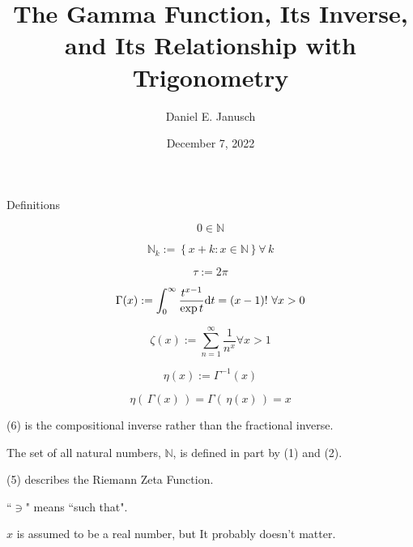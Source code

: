 \documentclass[12pt]{article}
\begin{document}
\title{The Gamma Function, Its Inverse, and Its Relationship with Trigonometry}
\author{Daniel E. Janusch}
\date{December 7, 2022} %
\maketitle

\begin{section}{Definitions}

	\begin{equation}
		0\in\mathbb N
	\end{equation}

	\begin{equation}
		\mathbb N_k:=\left\{x+k:x\in\mathbb N\right\}\forall\,k
	\end{equation}

	\begin{equation}
		\tau:=2\pi
	\end{equation}

	\begin{equation}
		\Gamma(x):=\int_0^\infty\dfrac{t^{x-1}}{\exp t}\text dt=(x-1)!~\forall x>0
	\end{equation}

	\begin{equation}
		\zeta(x):=\sum_{n=1}^\infty\dfrac1{n^x}\forall x>1
	\end{equation}

	\begin{equation}
		\eta(x):=\Gamma^{-1}(x)
	\end{equation}

	\begin{equation}
		\eta(\,\Gamma(x)\,)=\Gamma(\,\eta(x)\,)=x
	\end{equation}

	(6) is the compositional inverse rather than the fractional inverse.

	The set of all natural numbers, $\mathbb N$, is defined in part by (1) and (2).

	(5) describes the Riemann Zeta Function.

	``$\ni$" means ``such that".

	$x$ is assumed to be a real number, but It probably doesn't matter.
\end{section}
\end{document}
